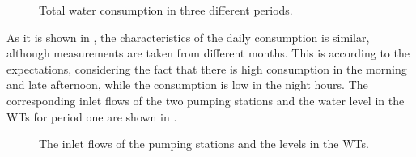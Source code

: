 \vspace{-3mm}
  \begin{figure}[H]
  \centering
   
  \vspace{-2.5mm}
  \caption{Total water consumption in three different periods.}
  \label{fig:data_allconsumption}
  \end{figure}
 \vspace{-3mm}

As it is shown in , the characteristics of the daily consumption is similar, although measurements are taken from different months. This is according to the expectations, considering the fact that there is high consumption in the morning and late afternoon, while the consumption is low in the night hours. The corresponding inlet flows of the two pumping stations and the water level in the WTs for period one are shown in . 
\vspace{-3mm}

  \begin{figure}[H]
  \centering
   
  \label{fig:inlet_flows_p1}
  \end{figure}
 \vspace{-8mm}


  \begin{figure}[H]
  \centering
   
  \label{fig:w3_p1}
  \end{figure}
 \vspace{-8mm}


  \begin{figure}[H]
  \centering
   
  \vspace{-2.5mm}
  \caption{The inlet flows of the pumping stations and the levels in the WTs.}
  \label{fig:w1_w2_p1}
  \end{figure}
  \vspace{-3mm}

